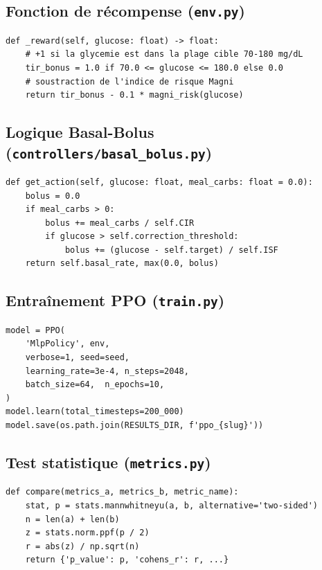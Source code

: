 \documentclass[a4paper,12pt]{report}
\begin{document}
\subsection{Fonction de récompense (\texttt{env.py})}

\begin{lstlisting}[caption={Récompense composite : bonus TIR + pénalité de risque Magni}]
def _reward(self, glucose: float) -> float:
    # +1 si la glycemie est dans la plage cible 70-180 mg/dL
    tir_bonus = 1.0 if 70.0 <= glucose <= 180.0 else 0.0
    # soustraction de l'indice de risque Magni
    return tir_bonus - 0.1 * magni_risk(glucose)
\end{lstlisting}

\subsection{Logique Basal-Bolus (\texttt{controllers/basal\_bolus.py})}

\begin{lstlisting}[caption={Calcul de la dose Basal-Bolus à chaque pas de temps}]
def get_action(self, glucose: float, meal_carbs: float = 0.0):
    bolus = 0.0
    if meal_carbs > 0:
        bolus += meal_carbs / self.CIR
        if glucose > self.correction_threshold:
            bolus += (glucose - self.target) / self.ISF
    return self.basal_rate, max(0.0, bolus)
\end{lstlisting}

\subsection{Entraînement PPO (\texttt{train.py})}

\begin{lstlisting}[caption={Entraînement d'un agent PPO par patient avec Stable-Baselines3}]
model = PPO(
    'MlpPolicy', env,
    verbose=1, seed=seed,
    learning_rate=3e-4, n_steps=2048,
    batch_size=64,  n_epochs=10,
)
model.learn(total_timesteps=200_000)
model.save(os.path.join(RESULTS_DIR, f'ppo_{slug}'))
\end{lstlisting}

\subsection{Test statistique (\texttt{metrics.py})}

\begin{lstlisting}[caption={Test Mann-Whitney U et taille d'effet de Cohen r}]
def compare(metrics_a, metrics_b, metric_name):
    stat, p = stats.mannwhitneyu(a, b, alternative='two-sided')
    n = len(a) + len(b)
    z = stats.norm.ppf(p / 2)
    r = abs(z) / np.sqrt(n)
    return {'p_value': p, 'cohens_r': r, ...}
\end{lstlisting}
\end{document}
